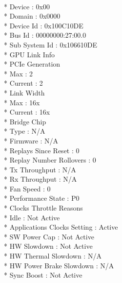 \documentclass{article}
\begin{document}
     \\*    Device                            : 0x00
    \\*     Domain                            : 0x0000
     \\*    Device Id                         : 0x100C10DE
    \\*     Bus Id                            : 00000000:27:00.0
     \\*    Sub System Id                     : 0x106610DE
      \\*   GPU Link Info
       \\*      PCIe Generation
      \\*           Max                       : 2
       \\*          Current                   : 2
       \\*      Link Width
      \\*           Max                       : 16x
     \\*            Current                   : 16x
     \\*    Bridge Chip
     \\*        Type                          : N/A
      \\*       Firmware                      : N/A
      \\*   Replays Since Reset               : 0
     \\*    Replay Number Rollovers           : 0
     \\*    Tx Throughput                     : N/A
     \\*    Rx Throughput                     : N/A
   \\*  Fan Speed                             : 0 %
    \\* Performance State                     : P0
    \\* Clocks Throttle Reasons
    \\*     Idle                              : Not Active
    \\*     Applications Clocks Setting       : Active
     \\*    SW Power Cap                      : Not Active
      \\*   HW Slowdown                       : Not Active
       \\*      HW Thermal Slowdown           : N/A
      \\*       HW Power Brake Slowdown       : N/A
     \\*    Sync Boost                        : Not Active
\end{document}
